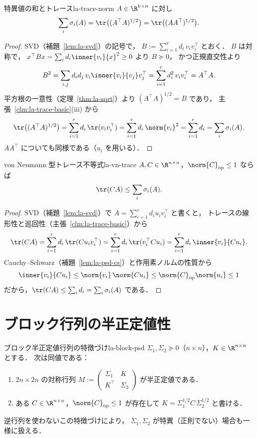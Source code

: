 \begin{lemma}{特異値の和とトレース}{la-trace-norm}
  $A\in\R^{k\times n}$ に対し
  \[
    \sum_i\sigma_i(A)
    =\tr\bigl((A^\top A)^{1/2}\bigr)
    =\tr\bigl((AA^\top)^{1/2}\bigr).
  \]
\end{lemma}

\begin{proof}
  SVD（補題~\ref{lem:la-svd}）の記号で，
  $B:=\sum_{i=1}^rd_i\,v_iv_i^\top$ とおく．
  $B$ は対称で，
  $x^\top Bx=\sum_id_i\inner{v_i}{x}^2\geq0$ より $B\succeq0$，
  かつ正規直交性より
  \[
    B^2=\sum_{i,j}d_id_j\,v_i\inner{v_i}{v_j}v_j^\top
    =\sum_{i=1}^rd_i^2\,v_iv_i^\top=A^\top A.
  \]
  平方根の一意性（定理~\ref{thm:la-sqrt}）より
  $(A^\top A)^{1/2}=B$ であり，
  主張~\ref{clm:la-trace-basic}(iii) から
  \[
    \tr\bigl((A^\top A)^{1/2}\bigr)
    =\sum_{i=1}^rd_i\,\tr(v_iv_i^\top)
    =\sum_{i=1}^rd_i\,\norm{v_i}^2
    =\sum_{i=1}^rd_i
    =\sum_i\sigma_i(A).
  \]
  $AA^\top$ についても同様である（$u_i$ を用いる）．
\end{proof}

\begin{lemma}{von Neumann 型トレース不等式}{la-vn-trace}
  $A,C\in\R^{n\times n}$，$\norm{C}_{\mathrm{op}}\leq1$ ならば
  \[
    \tr(CA)\leq\sum_i\sigma_i(A).
  \]
\end{lemma}

\begin{proof}
  SVD（補題~\ref{lem:la-svd}）で $A=\sum_{i=1}^rd_iu_iv_i^\top$ と書くと，
  トレースの線形性と巡回性（主張~\ref{clm:la-trace-basic}）から
  \[
    \tr(CA)
    =\sum_{i=1}^rd_i\,\tr(Cu_iv_i^\top)
    =\sum_{i=1}^rd_i\,\tr(v_i^\top Cu_i)
    =\sum_{i=1}^rd_i\,\inner{v_i}{Cu_i}.
  \]
  Cauchy--Schwarz（補題~\ref{lem:la-psd-cs}）と作用素ノルムの性質から
  \[
    \inner{v_i}{Cu_i}
    \leq\norm{v_i}\,\norm{Cu_i}
    \leq\norm{C}_{\mathrm{op}}\norm{u_i}
    \leq1
  \]
  だから，$\tr(CA)\leq\sum_id_i=\sum_i\sigma_i(A)$ である．
\end{proof}

\section{ブロック行列の半正定値性}

\begin{lemma}{ブロック半正定値行列の特徴づけ}{la-block-psd}
  $\Sigma_1,\Sigma_2\succeq0$（$n\times n$），$K\in\R^{n\times n}$ とする．
  次は同値である：
  \begin{enumerate}
    \item $2n\times2n$ の対称行列
      $M:=\begin{pmatrix}\Sigma_1&K\\K^\top&\Sigma_2\end{pmatrix}$
      が半正定値である．
    \item ある $C\in\R^{n\times n}$，$\norm{C}_{\mathrm{op}}\leq1$ が存在して
      $K=\Sigma_1^{1/2}C\,\Sigma_2^{1/2}$ と書ける．
  \end{enumerate}
  逆行列を使わないこの特徴づけにより，
  $\Sigma_1,\Sigma_2$ が特異（正則でない）場合も一様に扱える．
\end{lemma}

